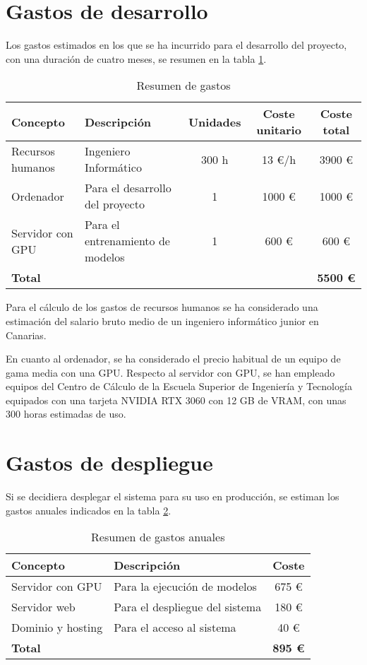 \section{Gastos de desarrollo}
Los gastos estimados en los que se ha incurrido para el desarrollo del proyecto, con una duración de cuatro meses,
 se resumen en la tabla \ref{tabla_presupuesto_desarrollo}. 

\begin{table}[h]
   \centering
   \small
   \caption{Resumen de gastos}
   \begin{tabular}{|l|l|c|c|c|}
      \hline
      \textbf{Concepto} & \textbf{Descripción} & \textbf{Unidades} & \textbf{Coste unitario} & \textbf{Coste total} \\ \hline
      Recursos humanos & Ingeniero Informático & 300 h & 13 €/h & 3900 € \\ \hline
      Ordenador & Para el desarrollo del proyecto & 1 & 1000 € & 1000 € \\ \hline
      Servidor con GPU & Para el entrenamiento de modelos & 1 & 600 € & 600 € \\ \hline
      \textbf{Total} & & & & \textbf{5500 €} \\ \hline
   \end{tabular}
   \label{tabla_presupuesto_desarrollo}
\end{table}

Para el cálculo de los gastos de recursos humanos se ha considerado una estimación del salario bruto medio de un ingeniero informático junior en Canarias.

En cuanto al ordenador, se ha considerado el precio habitual de un equipo de gama media con una GPU. Respecto al servidor con GPU, se han empleado equipos del 
Centro de Cálculo de la Escuela Superior de Ingeniería y Tecnología equipados con una tarjeta NVIDIA RTX 3060 con 12 GB de VRAM, con unas 300 horas estimadas de uso.

\section{Gastos de despliegue}
Si se decidiera desplegar el sistema para su uso en producción, se estiman los gastos anuales indicados
en la tabla \ref{tabla_presupuesto_despliegue}.

\begin{table}[h]
   \centering
   \small
   \caption{Resumen de gastos anuales}
   \begin{tabular}{|l|l|c|}
      \hline
      \textbf{Concepto} & \textbf{Descripción} & \textbf{Coste} \\ \hline
      Servidor con GPU & Para la ejecución de modelos  & 675 € \\ \hline
      Servidor web & Para el despliegue del sistema  & 180 € \\ \hline
      Dominio y hosting & Para el acceso al sistema  & 40 € \\ \hline
      \textbf{Total}  & & \textbf{895 €} \\ \hline
   \end{tabular}
   \label{tabla_presupuesto_despliegue}
\end{table}

